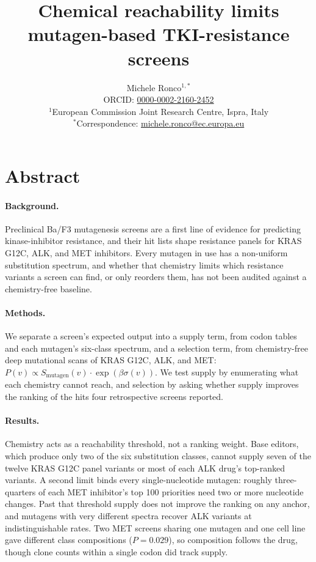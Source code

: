 \documentclass[11pt,a4paper]{article}
\title{\bfseries\LARGE Chemical reachability limits mutagen-based TKI-resistance screens}
\author{Michele Ronco$^{1,*}$ \\[0.3em]
\small ORCID: \href{https://orcid.org/0000-0002-2160-2452}{0000-0002-2160-2452} \\[0.3em]
\small $^{1}$European Commission Joint Research Centre, Ispra, Italy \\
\small $^{*}$Correspondence: \href{mailto:michele.ronco@ec.europa.eu}{michele.ronco@ec.europa.eu}}
\date{}
\begin{document}
\maketitle

\section*{Abstract}

\paragraph{Background.}
Preclinical Ba/F3 mutagenesis screens are a first line of evidence for
predicting kinase-inhibitor resistance, and their hit lists shape
resistance panels for KRAS G12C, ALK, and MET inhibitors. Every mutagen
in use has a non-uniform substitution spectrum, and whether that
chemistry limits which resistance variants a screen can find, or only
reorders them, has not been audited against a chemistry-free baseline.

\paragraph{Methods.}
We separate a screen's expected output into a supply term, from codon
tables and each mutagen's six-class spectrum, and a selection term,
from chemistry-free deep mutational scans of KRAS G12C, ALK, and MET:
$P(v) \propto S_{\mathrm{mutagen}}(v) \cdot \exp(\beta\sigma(v))$. We
test supply by enumerating what each chemistry cannot reach, and
selection by asking whether supply improves the ranking of the hits
four retrospective screens reported.

\paragraph{Results.}
Chemistry acts as a reachability threshold, not a ranking weight. Base
editors, which produce only two of the six substitution classes, cannot
supply seven of the twelve KRAS G12C panel variants or most of each ALK
drug's top-ranked variants. A second limit binds every
single-nucleotide mutagen: roughly three-quarters of each MET
inhibitor's top 100 priorities need two or more nucleotide changes.
Past that threshold supply does not improve the ranking on any anchor,
and mutagens with very different spectra recover ALK variants at
indistinguishable rates. Two MET screens sharing one mutagen and one
cell line gave different class compositions ($P = 0.029$), so
composition follows the drug, though clone counts within a single codon
did track supply.
\end{document}
